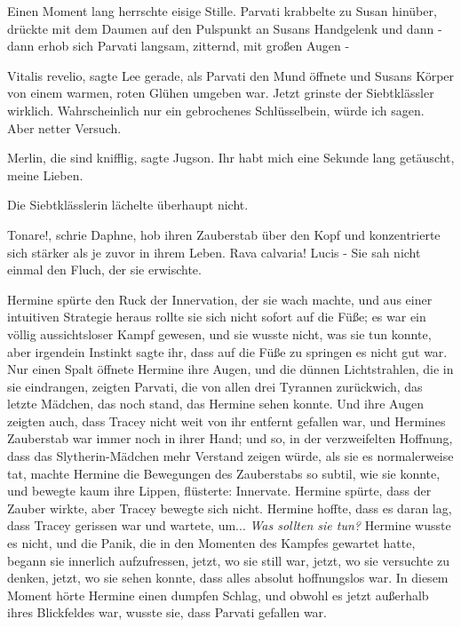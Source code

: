 Einen Moment lang herrschte eisige Stille. Parvati krabbelte zu Susan hinüber,
drückte mit dem Daumen auf den Pulspunkt an Susans Handgelenk und dann - dann
erhob sich Parvati langsam, zitternd, mit großen Augen -

\glqq Vitalis revelio\grqq{}, sagte Lee gerade, als Parvati den Mund öffnete und
Susans Körper von einem warmen, roten Glühen umgeben war. Jetzt grinste der
Siebtklässler wirklich. \glqq Wahrscheinlich nur ein gebrochenes Schlüsselbein,
würde ich sagen. Aber netter Versuch.\grqq{}

\glqq Merlin, die sind knifflig\grqq{}, sagte Jugson. \glqq Ihr habt mich eine
Sekunde lang getäuscht, meine Lieben.\grqq{}

Die Siebtklässlerin lächelte überhaupt nicht.

\glqq Tonare!\grqq{}, schrie Daphne, hob ihren Zauberstab über den Kopf und
konzentrierte sich stärker als je zuvor in ihrem Leben. \glqq Rava calvaria!
Lucis -\grqq{} Sie sah nicht einmal den Fluch, der sie erwischte.

Hermine spürte den Ruck der Innervation, der sie wach machte, und aus einer
intuitiven Strategie heraus rollte sie sich nicht sofort auf die Füße; es war
ein völlig aussichtsloser Kampf gewesen, und sie wusste nicht, was sie tun
konnte, aber irgendein Instinkt sagte ihr, dass auf die Füße zu springen es
nicht gut war. Nur einen Spalt öffnete Hermine ihre Augen, und die dünnen
Lichtstrahlen, die in sie eindrangen, zeigten Parvati, die von allen drei
Tyrannen zurückwich, das letzte Mädchen, das noch stand, das Hermine sehen
konnte. Und ihre Augen zeigten auch, dass Tracey nicht weit von ihr entfernt
gefallen war, und Hermines Zauberstab war immer noch in ihrer Hand; und so, in
der verzweifelten Hoffnung, dass das Slytherin-Mädchen mehr Verstand zeigen
würde, als sie es normalerweise tat, machte Hermine die Bewegungen des
Zauberstabs so subtil, wie sie konnte, und bewegte kaum ihre Lippen, flüsterte:
\glqq Innervate.\grqq{} Hermine spürte, dass der Zauber wirkte, aber Tracey
bewegte sich nicht. Hermine hoffte, dass es daran lag, dass Tracey gerissen war
und wartete, um... \emph{Was sollten sie tun?} Hermine wusste es nicht, und die
Panik, die in den Momenten des Kampfes gewartet hatte, begann sie innerlich
aufzufressen, jetzt, wo sie still war, jetzt, wo sie versuchte zu denken, jetzt,
wo sie sehen konnte, dass alles absolut hoffnungslos war. In diesem Moment hörte
Hermine einen dumpfen Schlag, und obwohl es jetzt außerhalb ihres Blickfeldes
war, wusste sie, dass Parvati gefallen war.

